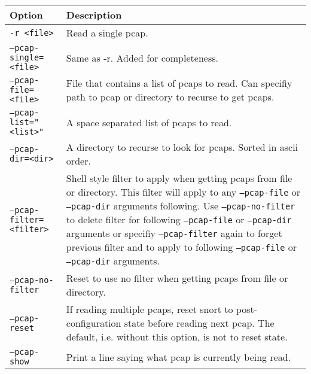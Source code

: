 \documentclass[english]{report}
\begin{document}
\begin{center}
\begin{tabular}{| l | p{4.5in} |}

\hline
\textbf{Option} & \textbf{Description}\\
\hline 

\hline 
\texttt{-r <file>} &

Read a single pcap. \\

\hline
\texttt{--pcap-single=<file>} &

Same as -r.  Added for completeness. \\

\hline
\texttt{--pcap-file=<file>} &

File that contains a list of pcaps to read.  Can specifiy path to pcap or
directory to recurse to get pcaps. \\

\hline
\texttt{--pcap-list="<list>"} &

A space separated list of pcaps to read. \\

\hline
\texttt{--pcap-dir=<dir>} &

A directory to recurse to look for pcaps.  Sorted in ascii order. \\

\hline
\texttt{--pcap-filter=<filter>} &

Shell style filter to apply when getting pcaps from file or directory.  This
filter will apply to any \texttt{--pcap-file} or \texttt{--pcap-dir} arguments
following.  Use \texttt{--pcap-no-filter} to delete filter for following
\texttt{--pcap-file} or \texttt{--pcap-dir} arguments or specifiy
\texttt{--pcap-filter} again to forget previous filter and to apply to
following \texttt{--pcap-file} or \texttt{--pcap-dir} arguments. \\

\hline
\texttt{--pcap-no-filter} &

Reset to use no filter when getting pcaps from file or directory. \\

\hline
\texttt{--pcap-reset} &

If reading multiple pcaps, reset snort to post-configuration state before
reading next pcap.  The default, i.e. without this option, is not to reset
state. \\

\hline
\texttt{--pcap-show} &

Print a line saying what pcap is currently being read. \\

\hline
\end{tabular}
\end{center}
\end{document}
